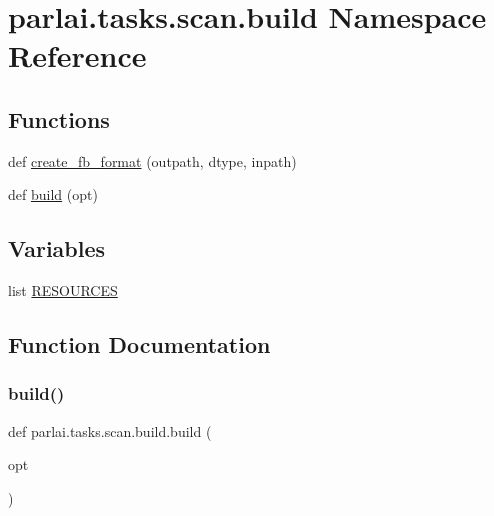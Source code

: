 \hypertarget{namespaceparlai_1_1tasks_1_1scan_1_1build}{}\section{parlai.\+tasks.\+scan.\+build Namespace Reference}
\label{namespaceparlai_1_1tasks_1_1scan_1_1build}
\subsection*{Functions}
\begin{DoxyCompactItemize}
\item 
def \hyperlink{namespaceparlai_1_1tasks_1_1scan_1_1build_acd920598e2932f5f8db51dcf6e25a00c}{create\+\_\+fb\+\_\+format} (outpath, dtype, inpath)
\item 
def \hyperlink{namespaceparlai_1_1tasks_1_1scan_1_1build_ad191bbde08667e24f385a91cb8bd235a}{build} (opt)
\end{DoxyCompactItemize}
\subsection*{Variables}
\begin{DoxyCompactItemize}
\item 
list \hyperlink{namespaceparlai_1_1tasks_1_1scan_1_1build_a2ffa186ae863ea2f01869a3afb9ce4e0}{R\+E\+S\+O\+U\+R\+C\+ES}
\end{DoxyCompactItemize}


\subsection{Function Documentation}
\mbox{\label{namespaceparlai_1_1tasks_1_1scan_1_1build_ad191bbde08667e24f385a91cb8bd235a}} 
\subsubsection{\texorpdfstring{build()}{build()}}
{\footnotesize\ttfamily def parlai.\+tasks.\+scan.\+build.\+build (\begin{DoxyParamCaption}\item[{}]{opt }\end{DoxyParamCaption})}

